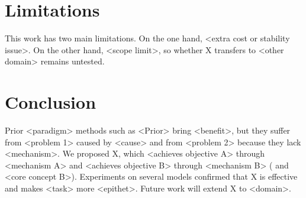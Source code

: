 \section{Limitations} \label{sec:limitations}
This work has two main limitations.
On the one hand, <extra cost or stability issue>.
On the other hand, <scope limit>, so whether X transfers to <other domain> remains untested.

\section{Conclusion} \label{sec:conclusion}
Prior <paradigm> methods such as <Prior> \citep{Placeholder-A} bring <benefit>, but they suffer from <problem 1> caused by <cause> and from <problem 2> because they lack <mechanism>.
We proposed X, which <achieves objective A> through <mechanism A> and <achieves objective B> through <mechanism B> ( and <core concept B>).
Experiments on several models confirmed that X is effective and makes <task> more <epithet>.
Future work will extend X to <domain>.

\label{main-text-end}  %


